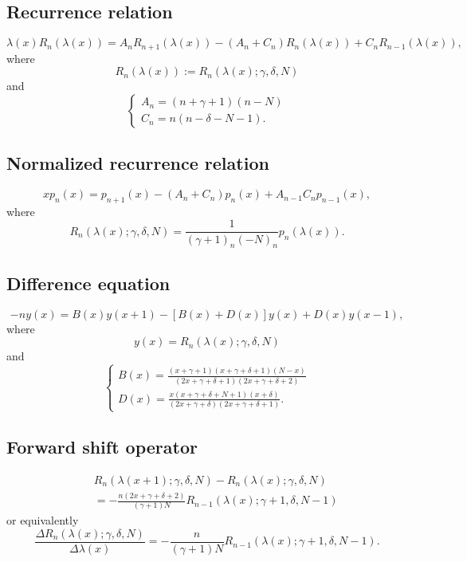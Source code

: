 \documentclass[envcountchap,graybox]{svmono}
\begin{document}
\subsection*{Recurrence relation}
\begin{equation}
\label{RecDualHahn}
\lambda(x)R_n(\lambda(x))
=A_nR_{n+1}(\lambda(x))-\left(A_n+C_n\right)R_n(\lambda(x))+C_nR_{n-1}(\lambda(x)),
\end{equation}
where
$$R_n(\lambda(x)):=R_n(\lambda(x);\gamma,\delta,N)$$
and
$$\left\{\begin{array}{l}
\displaystyle A_n=(n+\gamma+1)(n-N)\\[5mm]
\displaystyle C_n=n(n-\delta-N-1).
\end{array}\right.$$

\subsection*{Normalized recurrence relation}
\begin{equation}
\label{NormRecDualHahn}
xp_n(x)=p_{n+1}(x)-(A_n+C_n)p_n(x)+A_{n-1}C_np_{n-1}(x),
\end{equation}
where
$$R_n(\lambda(x);\gamma,\delta,N)=\frac{1}{(\gamma+1)_n(-N)_n}p_n(\lambda(x)).$$

\subsection*{Difference equation}
\begin{equation}
\label{dvDualHahn}
-ny(x)=B(x)y(x+1)-\left[B(x)+D(x)\right]y(x)+D(x)y(x-1),
\end{equation}
where
$$y(x)=R_n(\lambda(x);\gamma,\delta,N)$$
and
$$\left\{\begin{array}{l}
\displaystyle B(x)=\frac{(x+\gamma+1)(x+\gamma+\delta+1)(N-x)}{(2x+\gamma+\delta+1)(2x+\gamma+\delta+2)}\\[5mm]
\displaystyle D(x)=\frac{x(x+\gamma+\delta+N+1)(x+\delta)}{(2x+\gamma+\delta)(2x+\gamma+\delta+1)}.
\end{array}\right.$$

\subsection*{Forward shift operator}
\begin{eqnarray}
\label{shift1DualHahnI}
& &R_n(\lambda(x+1);\gamma,\delta,N)-R_n(\lambda(x);\gamma,\delta,N)\nonumber\\
& &{}=-\frac{n(2x+\gamma+\delta+2)}{(\gamma+1)N}R_{n-1}(\lambda(x);\gamma+1,\delta,N-1)
\end{eqnarray}
or equivalently
\begin{equation}
\label{shift1DualHahnII}
\frac{\Delta R_n(\lambda(x);\gamma,\delta,N)}{\Delta\lambda(x)}=
-\frac{n}{(\gamma+1)N}R_{n-1}(\lambda(x);\gamma+1,\delta,N-1).
\end{equation}
\end{document}
